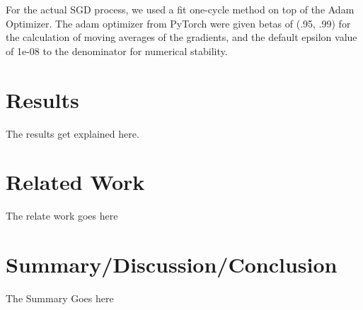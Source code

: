 \documentclass[10pt,twocolumn,letterpaper]{article}
\begin{document}
  For the actual SGD process, we used a fit one-cycle method on top of the Adam
  Optimizer. The adam optimizer from PyTorch were given betas of (.95, .99) for
  the calculation of moving averages of the gradients, and the default epsilon
  value of 1e-08 to the denominator for numerical stability.

\section{Results}
The results get explained here.

\section{Related Work}
The relate work goes here

\section{Summary/Discussion/Conclusion}
The Summary Goes here











\end{document}
